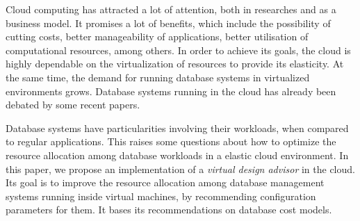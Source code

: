Cloud computing has attracted a lot of attention, both in researches and as a business model. It promises a lot of benefits, which include the possibility of cutting costs, better manageability of applications, better utilisation of computational resources, among others. In order to achieve its goals, the cloud is highly dependable on the virtualization of resources to provide its elasticity. At the same time, the demand for running database systems in virtualized environments grows. Database systems running in the cloud has already been debated by some recent papers.

Database systems have particularities involving their workloads, when compared to regular applications. This raises some questions about how to optimize the resource allocation among database workloads in a elastic cloud environment. In this paper, we propose an implementation of a \textit{virtual design advisor} in the cloud. Its goal is to improve the resource allocation among database management systems running inside virtual machines, by recommending configuration parameters for them. It bases its recommendations on database cost models.